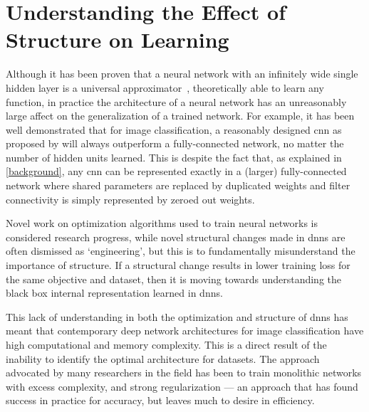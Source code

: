 \documentclass[thesis]{subfiles}
\begin{document}
\section[Understanding the Effect of Structure on Learning]{Understanding the Effect of\\Structure on Learning}
Although it has been proven that a neural network with an infinitely wide single hidden layer is a universal approximator~\citep{journals/mcss/Cybenko92,hornik89a},  theoretically able to learn any function, in practice the architecture of a neural network has an unreasonably large affect on the generalization of a trained network. For example, it has been well demonstrated that for image classification, a reasonably designed \gls{cnn} as proposed by \citet{Lecun1998} will always outperform a fully-connected network, no matter the number of hidden units learned. This is despite the fact that, as explained in \cref{background}, any \gls{cnn} can be represented exactly in a (larger) fully-connected network where shared parameters are replaced by duplicated weights and filter connectivity is simply represented by zeroed out weights.

Novel work on optimization algorithms used to train neural networks is considered research progress, while novel structural changes made in \glspl{dnn} are often dismissed as `engineering', but this is to fundamentally misunderstand the importance of structure. If a structural change results in lower training loss for the same objective and dataset, then it is moving towards understanding the black box internal representation learned in \glspl{dnn}. %

This lack of understanding in both the optimization and structure of \glspl{dnn} has meant that contemporary deep network architectures for image classification have high computational and memory complexity. This is a direct result of the inability to identify the optimal architecture for datasets. The approach advocated by many researchers in the field has been to train monolithic networks with excess complexity, and strong regularization --- an approach that has found success in practice for accuracy, but leaves much to desire in efficiency.
\end{document}
